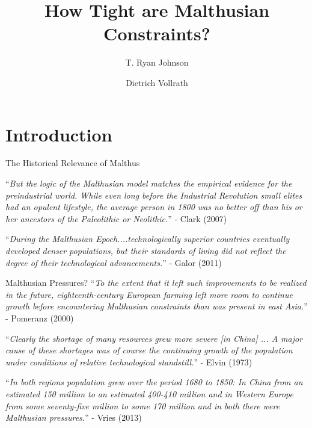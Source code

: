 \documentclass[10pt, xcolor=dvipsnames]{beamer}
\title[Land Constraints]{{How Tight are Malthusian Constraints?}}
\author[Johnson \& Vollrath]{T. Ryan Johnson \inst{1} \and Dietrich Vollrath \inst{2}}
\institute[UH]{\inst{1} University of Houston \and %
                      \inst{2} University of Houston}
\date[February 2017]{}
\begin{document}
\maketitle

\section{Introduction}


\begin{frame}{The Historical Relevance of Malthus}
 
 ``\textit{But the logic of the Malthusian model matches the empirical evidence for the preindustrial world. While even long before the Industrial Revolution small elites had an opulent lifestyle, the average person in 1800 was no better off than his or her ancestors of the Paleolithic or Neolithic.}'' - Clark (2007)

\vspace{1cm}
 ``\textit{During the Malthusian Epoch....technologically superior countries eventually developed denser populations, but their standards of living did not reflect the degree of their technological advancements.}'' - Galor (2011)

\end{frame}

\begin{frame}{Malthusian Pressures?}
``\textit{To the extent that it left such improvements to be realized in the future, eighteenth-century European farming left more room to continue growth before encountering Malthusian constraints than was present in east Asia.}'' - Pomeranz (2000)

\vspace{.5cm}
``\textit{Clearly the shortage of many resources grew more severe [in China] ... A major cause of these shortages was of course the continuing growth of the population under conditions of relative technological standstill.}'' - Elvin (1973)

\vspace{.5cm}
``\textit{In both regions population grew over the period 1680 to 1850: In China from an estimated 150 million to an estimated 400-410 million and in Western Europe from some seventy-five million to some 170 million and in both there were Malthusian pressures.}'' - Vries (2013)
\end{frame}
\end{document}
